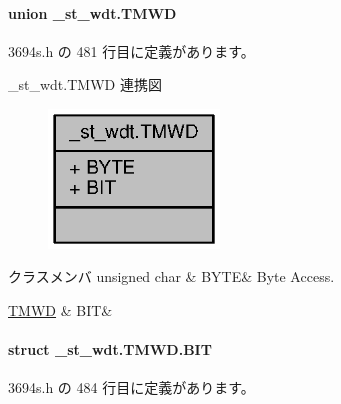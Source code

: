 \paragraph{union \+\_\+st\+\_\+wdt.\+T\+M\+W\+D}


 3694s.\+h の 481 行目に定義があります。



\+\_\+st\+\_\+wdt.\+T\+M\+W\+D 連携図
\nopagebreak
\begin{figure}[H]
\begin{center}
\leavevmode
\includegraphics[width=129pt]{dd/d05/union__st__wdt_8TMWD__coll__graph}
\end{center}
\end{figure}
\begin{DoxyFields}{クラスメンバ}
unsigned char\label{3694s_8h_ae409eb2ba6eb6801f52763ae370c350e}
&
B\+Y\+T\+E&
Byte Access. \\
\hline

\hyperlink{3694s_8h_d9/d28/struct__st__wdt_8TMWD_8BIT}{T\+M\+W\+D}\label{3694s_8h_adb957fdc8000e1eef04a243f5199aa52}
&
B\+I\+T&
\\
\hline

\end{DoxyFields}
\label{struct__st__wdt_8TMWD_8BIT}
\paragraph{struct \+\_\+st\+\_\+wdt.\+T\+M\+W\+D.\+B\+I\+T}


 3694s.\+h の 484 行目に定義があります。




